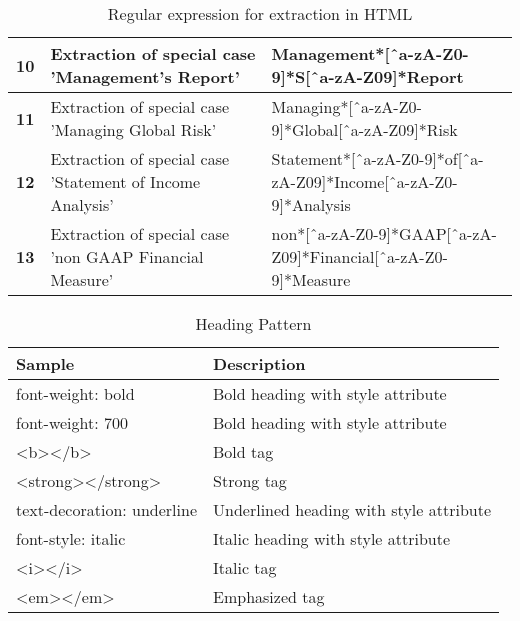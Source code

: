 \documentclass[logo,bsc,singlespacing,parskip]{infthesis}
\begin{document}
\begin{table}[ht]
\begin{tabular}{|m{0.5cm}|m{7cm}|m{7cm}|}
        \hline
        \textbf{10} & {\scriptsize Extraction of special case ’Management’s Report’} & {\scriptsize Management*[ˆa-zA-Z0-9]*S[ˆa-zA-Z09]*Report} \\
        \hline
        \textbf{11} & {\scriptsize Extraction of special case ’Managing Global Risk’} & {\scriptsize Managing*[ˆa-zA-Z0-9]*Global[ˆa-zA-Z09]*Risk} \\
        \hline
        \textbf{12} & {\scriptsize Extraction of special case ’Statement of Income Analysis’} & {\scriptsize Statement*[ˆa-zA-Z0-9]*of[ˆa-zA-Z09]*Income[ˆa-zA-Z0-9]*Analysis} \\
        \hline
        \textbf{13} & {\scriptsize Extraction of special case ’non GAAP Financial Measure’} & {\scriptsize non*[ˆa-zA-Z0-9]*GAAP[ˆa-zA-Z09]*Financial[ˆa-zA-Z0-9]*Measure} \\
        \hline
    \end{tabular}
    \caption{Regular expression for extraction in HTML}
    \label{tab:rex}
\end{table}

\begin{table}[ht]
    \centering
    \begin{tabular}{|l|l|}
        \hline
        \textbf{Sample} & \textbf{Description} \\
        \hline
        {\scriptsize font-weight: bold} & {\scriptsize Bold heading with style attribute} \\
        \hline
        \scriptsize{font-weight: 700} & {\scriptsize Bold heading with style attribute}  \\
        \hline
        \scriptsize{\textless b\textgreater\textless/b\textgreater} & {\scriptsize Bold tag}  \\
        \hline
        \scriptsize{<strong></strong>} & {\scriptsize Strong tag}  \\
        \hline
        \scriptsize{text-decoration: underline} & {\scriptsize Underlined heading with style attribute}  \\
        \hline
        \scriptsize{font-style: italic} & {\scriptsize Italic heading with style attribute} \\
        \hline
        \scriptsize{\textless i\textgreater\textless /i\textgreater} & {\scriptsize Italic tag} \\
        \hline
        \scriptsize{\textless em\textgreater\textless/em\textgreater} & {\scriptsize Emphasized tag} \\
        \hline
        
    \end{tabular}
    \caption{Heading Pattern}
    \label{tab:pattern}
\end{table}
\end{document}
